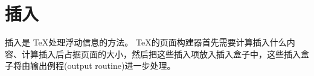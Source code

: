 \documentclass{book}
\begin{document}
\chapter{插入}\label{insert}


插入是 \TeX 处理浮动信息的方法。 \TeX 的页面构建器首先需要计算插入什么内容、计算插入后占据页面的大小，然后把这些插入项放入插入盒子中，这些插入盒子将由输出例程(output routine)进一步处理。
\end{document}

